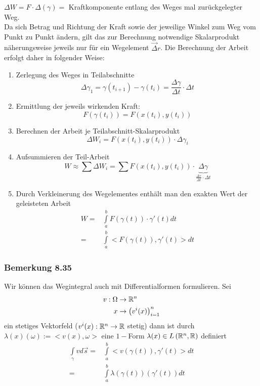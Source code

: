 $\Delta W= F\cdot \Delta (\gamma)=$ Kraftkomponente entlang des Weges mal zurückgelegter Weg. \\

Da sich Betrag und Richtung der Kraft sowie der jeweilige Winkel zum Weg vom Punkt zu Punkt ändern, gilt das zur Berechnung notwendige Skalarprodukt näherungsweise jeweils nur für ein Wegelement $\overrightarrow\Delta r$. Die Berechnung der Arbeit erfolgt daher in folgender Weise:
\begin{enumerate}[\indent a)]
\item Zerlegung des Weges in Teilabschnitte \[\Delta \gamma_1=\gamma (t_{i+1})-\gamma(t_i)=\frac{\Delta \gamma}{\Delta t}\cdot \Delta t\]
\item Ermittlung der jeweils wirkenden Kraft: \[F\left( {\gamma \left( {{t_i}} \right)} \right) = F\left( {x\left( {{t_i}} \right),y\left( {{t_i}} \right)} \right)\]
\item Berechnen der Arbeit je Teilabschnitt-Skalarprodukt \[\Delta {W_i} = F\left( {x\left( {{t_i}} \right),y\left( {{t_i}} \right)} \right) \cdot \Delta {\gamma _i}\]
\item Aufsummieren der Teil-Arbeit \[W \approx \sum {\Delta {W_i} = \sum {F\left( {x\left( {{t_i}} \right),y\left( {{t_i}} \right)} \right)} }  \cdot \underbrace {\Delta \gamma }_{\frac{{\Delta \gamma }}{{\Delta t}} \cdot \Delta t}\]
\item Durch Verkleinerung des Wegelementes enthält man den exakten Wert der geleisteten Arbeit
\begin{align*}
W = &\int\limits_a^b {F\left( {\gamma \left( t \right)} \right)}  \cdot \gamma '\left( t \right)dt\\
 = &\int\limits_a^b { < F\left( {\gamma \left( t \right)} \right)} ,\gamma '\left( t \right) > dt
\end{align*}
\end{enumerate}
\subsubsection*{Bemerkung 8.35}
Wir können das Wegintegral auch mit Differentialformen formulieren. Sei
\begin{align*}
v:\Omega &\to\mathbb{R}^n\\
x &\to\left( v^i(x)\right)_{i=1}^n
\end{align*}
ein stetiges Vektorfeld ($v^i(x):\mathbb{R}^n\to\mathbb{R}$ stetig) dann ist durch $\lambda (x)(\omega):=< v(x),\omega >$ eine $1-$Form $\lambda (x)\in L\left( \mathbb{R}^n,\mathbb{R}\right)$ definiert
\begin{align*}
\int\limits_\gamma  {vd\vec s}  = &\int\limits_a^b { < v\left( {\gamma (t)} \right),\gamma '(t) > dt}\\
 = &\int\limits_a^b {\lambda \left( {\gamma \left( t \right)} \right)\left( {\gamma '\left( t \right)} \right)dt}
\end{align*}

